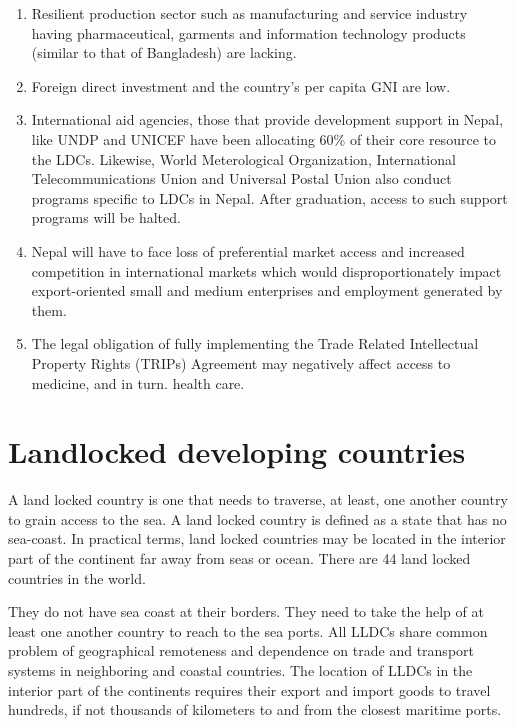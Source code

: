 \documentclass[
  openany]{book}
\providecommand{\tightlist}{%
  \setlength{\itemsep}{0pt}\setlength{\parskip}{0pt}}
\begin{document}
\begin{enumerate}
\def\labelenumi{\arabic{enumi}.}
\tightlist
\item
  Resilient production sector such as manufacturing and service industry having pharmaceutical, garments and information technology products (similar to that of Bangladesh) are lacking.
\item
  Foreign direct investment and the country's per capita GNI are low.
\item
  International aid agencies, those that provide development support in Nepal, like UNDP and UNICEF have been allocating 60\% of their core resource to the LDCs. Likewise, World Meterological Organization, International Telecommunications Union and Universal Postal Union also conduct programs specific to LDCs in Nepal. After graduation, access to such support programs will be halted.
\item
  Nepal will have to face loss of preferential market access and increased competition in international markets which would disproportionately impact export-oriented small and medium enterprises and employment generated by them.
\item
  The legal obligation of fully implementing the Trade Related Intellectual Property Rights (TRIPs) Agreement may negatively affect access to medicine, and in turn. health care.
\end{enumerate}

\hypertarget{landlocked-developing-countries}{%
\section{Landlocked developing countries}\label{landlocked-developing-countries}}

A land locked country is one that needs to traverse, at least, one another country to grain access to the sea. A land locked country is defined as a state that has no sea-coast. In practical terms, land locked countries may be located in the interior part of the continent far away from seas or ocean. There are 44 land locked countries in the world.

They do not have sea coast at their borders. They need to take the help of at least one another country to reach to the sea ports. All LLDCs share common problem of geographical remoteness and dependence on trade and transport systems in neighboring and coastal countries. The location of LLDCs in the interior part of the continents requires their export and import goods to travel hundreds, if not thousands of kilometers to and from the closest maritime ports.
\end{document}
